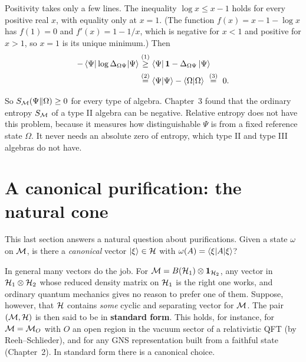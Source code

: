 Positivity takes only a few lines. The inequality $\log x\le x-1$ holds for every positive real $x$, with
equality only at $x=1$. (The function $f(x)=x-1-\log x$ has $f(1)=0$ and $f'(x)=1-1/x$, which is negative for
$x<1$ and positive for $x>1$, so $x=1$ is its unique minimum.) Then
\begin{align}
-\braket{\Psi|\log\Delta_{\Omega\Psi}|\Psi}
&\overset{(1)}{\ge} \braket{\Psi|\,\mathbf{1}-\Delta_{\Omega\Psi}\,|\Psi} \notag\\
&\overset{(2)}{=} \braket{\Psi|\Psi} - \braket{\Omega|\Omega}
\ \overset{(3)}{=}\ 0 . \notag
\end{align}
\quad
{}\quad
{}

So $S_{\mathcal{M}}(\Psi\|\Omega)\ge0$ for every type of algebra. Chapter~3 found that the ordinary entropy $S_{\mathcal{M}}$ of a
type II algebra can be negative. Relative entropy does not have this problem, because it measures how
distinguishable $\Psi$ is from a fixed reference state $\Omega$. It never needs an absolute zero of entropy,
which type II and type III algebras do not have.

\section{A canonical purification: the natural cone}

This last section answers a natural question about purifications. Given a state $\omega$ on $\mathcal{M}$, is there a
\emph{canonical} vector $\ket\xi\in\mathcal{H}$ with $\omega(A)=\braket{\xi|A|\xi}$?

In general many vectors do the job. For $\mathcal{M}=B(\mathcal{H}_1)\otimes\mathbf{1}_{\mathcal{H}_2}$, any vector in $\mathcal{H}_1\otimes\mathcal{H}_2$ whose
reduced density matrix on $\mathcal{H}_1$ is the right one works, and ordinary quantum mechanics gives no reason to
prefer one of them. Suppose, however, that $\mathcal{H}$ contains \emph{some} cyclic and separating vector for $\mathcal{M}$.
The pair $(\mathcal{M},\mathcal{H})$ is then said to be in \textbf{standard form}. This holds, for instance, for $\mathcal{M}=\mathcal{M}_O$ with
$O$ an open region in the vacuum sector of a relativistic QFT (by Reeh--Schlieder), and for any GNS
representation built from a faithful state (Chapter~2). In standard form there is a canonical choice.

